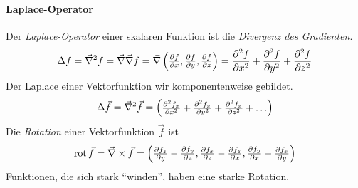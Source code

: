 \paragraph*{Laplace-Operator}
Der \emph{Laplace-Operator}%
%
einer skalaren Funktion ist die \emph{Divergenz des Gradienten}.
\begin{gather*}
  \Delta f = \vecna^2 f= \vecna\vecna f = \vecna 
  \begin{pmatrix}
	\dif[f]{x},\dif[f]{y},\dif[f]{z}
  \end{pmatrix}
  = \diff[f]{x} + \diff[f]{y} + \diff[f]{z}
\end{gather*}
Der Laplace einer Vektorfunktion wir komponentenweise gebildet.
\begin{gather*}
  \Delta \vec{f} = \vecna^2 \vec{f}= 
  \begin{pmatrix}
    \diff[f_x]{x}+\diff[f_x]{y}+\diff[f_x]{z}+\dots
  \end{pmatrix}
\end{gather*}
Die \emph{Rotation} einer Vektorfunktion $\vec{f}$ ist
\begin{gather*}
  \Rot \vec{f}= \vecna\times \vec{f}=
  \begin{pmatrix}
    \dif[f_z]{y}-\dif[f_y]{z},\dif[f_x]{z}-\dif[f_z]{x},\dif[f_y]{x}-\dif[f_x]{y}
  \end{pmatrix}
\end{gather*}
Funktionen, die sich stark \enquote{winden}, haben eine starke Rotation.





